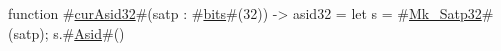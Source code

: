 function #\hyperref[sailRISCVzcurAsid32]{curAsid32}#(satp : #\hyperref[sailRISCVzbits]{bits}#(32)) -> asid32 = {
  let s = #\hyperref[sailRISCVzMkzySatp32]{Mk\_Satp32}#(satp);
  s.#\hyperref[sailRISCVzAsid]{Asid}#()
}
